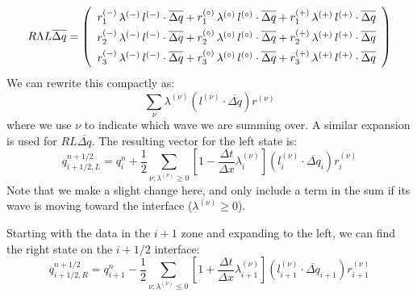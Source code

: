 \documentclass[11pt]{article}
\newcommand{\evm}{{(-)}}
\newcommand{\evz}{{(\circ)}}
\newcommand{\evp}{{(+)}}
\newcommand{\enu}{{(\nu)}}
\begin{document}
\begin{equation}
\renewcommand{\arraystretch}{1.5}
R\Lambda L \overline{\Delta q} =
   \left ( \begin{array}{c}
            r_1^\evm \, \lambda^\evm \, l^\evm \cdot \overline{\Delta q} +
            r_1^\evz \, \lambda^\evz \, l^\evz \cdot \overline{\Delta q} +
            r_1^\evp \, \lambda^\evp \, l^\evp \cdot \overline{\Delta q} \\
%
            r_2^\evm \, \lambda^\evm \, l^\evm \cdot \overline{\Delta q} +
            r_2^\evz \, \lambda^\evz \, l^\evz \cdot \overline{\Delta q} +
            r_2^\evp \, \lambda^\evp \, l^\evp \cdot \overline{\Delta q} \\
%
            r_3^\evm \, \lambda^\evm \, l^\evm \cdot \overline{\Delta q} +
            r_3^\evz \, \lambda^\evz \, l^\evz \cdot \overline{\Delta q} +
            r_3^\evp \, \lambda^\evp \, l^\evp \cdot \overline{\Delta q} \\
   \end{array} \right )
\renewcommand{\arraystretch}{1.0}
\end{equation}
We can rewrite this compactly as:
\begin{equation}
\sum_\nu \lambda^{(\nu)} (l^{(\nu)} \cdot \overline{\Delta q}) r^{(\nu)}
\end{equation}
where we use $\nu$ to indicate which wave we are summing over.  A similar 
expansion is used for $RL \overline{\Delta q}$.  The resulting vector
for the left state is:
\begin{equation}
q_{i+1/2,L}^{n+1/2} = q_i^n + \frac{1}{2} \sum_{\nu; \lambda^{(\nu)} \ge 0} 
  \left [ 1 - \frac{\Delta t}{\Delta x} \lambda_i^{(\nu)} \right ] (l_i^{(\nu)} \cdot \overline{\Delta q}_i) r_i^{(\nu)} 
\end{equation}
Note that we make a slight change here, and only include a term in the sum if
its wave is moving toward the interface ($\lambda^\enu \ge 0$).

Starting with the data in the $i+1$ zone and expanding to the left, we can
find the right state on the $i+1/2$ interface:
\begin{equation}
q_{i+1/2,R}^{n+1/2} = q_{i+1}^n - \frac{1}{2} \sum_{\nu; \lambda^{(\nu)} \le 0} 
  \left [ 1 + \frac{\Delta t}{\Delta x} \lambda_{i+1}^{(\nu)} \right ] (l_{i+1}^{(\nu)} \cdot \overline{\Delta q}_{i+1}) r_{i+1}^{(\nu)} 
\end{equation}
\end{document}
